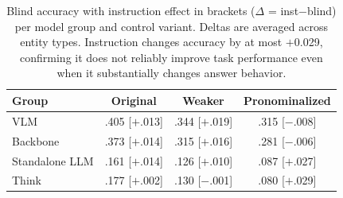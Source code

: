 \begin{table}[h]
\centering
\small
\setlength{\tabcolsep}{4pt}

\caption{Blind accuracy with instruction effect in brackets ($\Delta$ = inst$-$blind) per model group and control variant. Deltas are averaged across entity types. Instruction changes accuracy by at most $+$0.029, confirming it does not reliably improve task performance even when it substantially changes answer behavior.}
\label{tab:accuracy_inst_effect}
\begin{tabular}{lccc}
\toprule
Group & Original & Weaker & Pronominalized \\
\midrule
VLM            & .405 {\scriptsize[$+$.013]} & .344 {\scriptsize[$+$.019]} & .315 {\scriptsize[$-$.008]} \\
Backbone       & .373 {\scriptsize[$+$.014]} & .315 {\scriptsize[$+$.016]} & .281 {\scriptsize[$-$.006]} \\
Standalone LLM & .161 {\scriptsize[$+$.014]} & .126 {\scriptsize[$+$.010]} & .087 {\scriptsize[$+$.027]} \\
Think          & .177 {\scriptsize[$+$.002]} & .130 {\scriptsize[$-$.001]} & .080 {\scriptsize[$+$.029]} \\
\bottomrule
\end{tabular}
\end{table}
